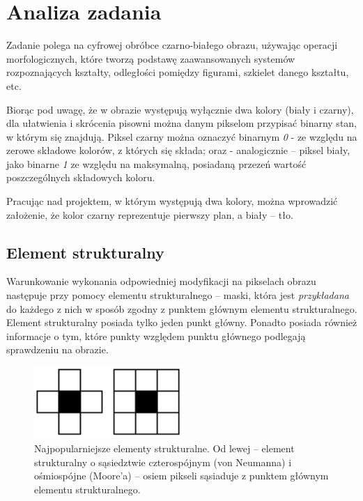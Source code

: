 \documentclass[12pt,a4paper,twoside]{article}
\begin{document}
\section{Analiza zadania}

Zadanie polega na cyfrowej obróbce czarno-białego obrazu, używając operacji morfologicznych, które tworzą podstawę zaawansowanych systemów rozpoznających kształty, odległości pomiędzy figurami, szkielet danego kształtu, etc. \par
Biorąc pod uwagę, że w obrazie występują wyłącznie dwa kolory (biały i czarny), dla ułatwienia i skrócenia pisowni można danym pikselom przypisać binarny stan, w którym się znajdują. Piksel czarny można oznaczyć binarnym \emph{0} - ze względu na zerowe składowe kolorów, z których się składa; oraz - analogicznie – piksel biały, jako binarne \emph{1} ze względu na maksymalną, posiadaną przezeń wartość poszczególnych składowych koloru. \par
Pracując nad projektem, w którym występują dwa kolory, można wprowadzić założenie, że kolor czarny reprezentuje pierwszy plan, a biały – tło.


\subsection{Element strukturalny}

Warunkowanie wykonania odpowiedniej modyfikacji na pikselach obrazu następuje przy pomocy elementu strukturalnego – maski, która jest \emph{przykładana} do każdego z nich w sposób zgodny z punktem głównym elementu strukturalnego. Element strukturalny posiada tylko jeden punkt główny. Ponadto posiada również informacje o tym, które punkty względem punktu głównego podlegają sprawdzeniu na obrazie. \par

\begin{figure}[hbt!]
  \centering
  \includegraphics[width=0.5\textwidth]{grafika1.png}
  \caption{Najpopularniejsze elementy strukturalne. Od lewej – element strukturalny o sąsiedztwie czterospójnym (von Neumanna) i ośmiospójne (Moore'a) –  osiem pikseli sąsiaduje z punktem głównym elementu strukturalnego.}  \label{fig:grafika1}
\end{figure}
\end{document}
